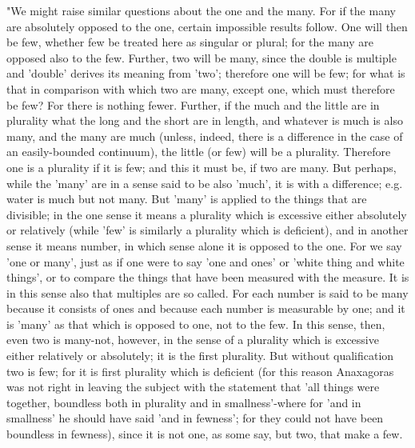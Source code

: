 "We might raise similar questions about the one and the many. For
if the many are absolutely opposed to the one, certain impossible
results follow. One will then be few, whether few be treated here
as singular or plural; for the many are opposed also to the few. Further,
two will be many, since the double is multiple and 'double' derives
its meaning from 'two'; therefore one will be few; for what is that
in comparison with which two are many, except one, which must therefore
be few? For there is nothing fewer. Further, if the much and the little
are in plurality what the long and the short are in length, and whatever
is much is also many, and the many are much (unless, indeed, there
is a difference in the case of an easily-bounded continuum), the little
(or few) will be a plurality. Therefore one is a plurality if it is
few; and this it must be, if two are many. But perhaps, while the
'many' are in a sense said to be also 'much', it is with a difference;
e.g. water is much but not many. But 'many' is applied to the things
that are divisible; in the one sense it means a plurality which is
excessive either absolutely or relatively (while 'few' is similarly
a plurality which is deficient), and in another sense it means number,
in which sense alone it is opposed to the one. For we say 'one or
many', just as if one were to say 'one and ones' or 'white thing and
white things', or to compare the things that have been measured with
the measure. It is in this sense also that multiples are so called.
For each number is said to be many because it consists of ones and
because each number is measurable by one; and it is 'many' as that
which is opposed to one, not to the few. In this sense, then, even
two is many-not, however, in the sense of a plurality which is excessive
either relatively or absolutely; it is the first plurality. But without
qualification two is few; for it is first plurality which is deficient
(for this reason Anaxagoras was not right in leaving the subject with
the statement that 'all things were together, boundless both in plurality
and in smallness'-where for 'and in smallness' he should have said
'and in fewness'; for they could not have been boundless in fewness),
since it is not one, as some say, but two, that make a few.

